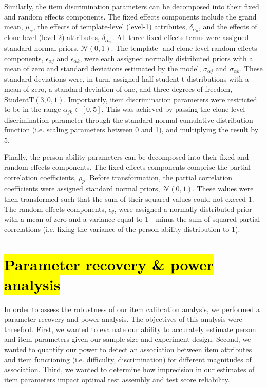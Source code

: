 \documentclass[a4paper,man,natbib]{apa6}
\begin{document}
Similarly, the item discrimination parameters can be decomposed into their fixed and random effects components. The fixed effects components include the grand mean, $\mu_\alpha$, the effects of template-level (level-1) attributes, $\delta_{\alpha_n}$, and the effects of clone-level (level-2) attributes, $\delta_{\alpha_m}$. All three fixed effects terms were assigned standard normal priors, $\mathcal{N}(0,1)$. The template- and clone-level random effects components, $\epsilon_{\alpha j}$ and $\epsilon_{\alpha k}$, were each assigned normally distributed priors with a mean of zero and standard deviations estimated by the model, $\sigma_{\alpha j}$ and $\sigma_{\alpha k}$. These standard deviations were, in turn, assigned half-student-t distributions with a mean of zero, a standard deviation of one, and three degrees of freedom, $\text{StudentT}(3, 0, 1)$. Importantly, item discrimination parameters were restricted to be in the range $\alpha_{jk} \in [0, 5]$. This was achieved by passing the clone-level discrimination parameter through the standard normal cumulative distribution function (i.e. scaling parameters between 0 and 1), and multiplying the result by 5.  

Finally, the person ability parameters can be decomposed into their fixed and random effects components. The fixed effects components comprise the partial correlation coefficients, $\rho_p$. Before transformation, the partial correlation coefficients were assigned standard normal priors, $\mathcal{N}(0,1)$. These values were then transformed such that the sum of their squared values could not exceed 1. The random effects components, $\epsilon_\theta$, were assigned a normally distributed prior with a mean of zero and a variance equal to 1 - minus the sum of squared partial correlations (i.e. fixing the variance of the person ability distribution to 1).

\section{\texorpdfstring{\hl{Parameter recovery \& power analysis}}{}}

In order to assess the robustness of our item calibration analysis, we performed a parameter recovery and power analysis. The objectives of this analysis were threefold. First, we wanted to evaluate our ability to accurately estimate person and item parameters given our sample size and experiment design. Second, we wanted to quantify our power to detect an association between item attributes and item functioning (i.e. difficulty, discrimination) for different magnitudes of association. Third, we wanted to determine how imprecision in our estimates of item parameters impact optimal test assembly and test score reliability. 
\end{document}
